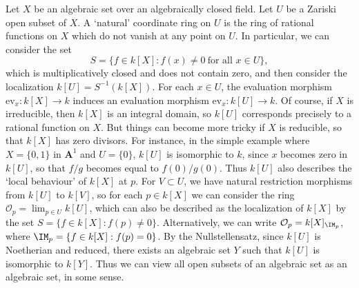 \begin{example}
    Let $X$ be an algebraic set over an algebraically closed field. Let $U$ be a Zariski open subset of $X$. A `natural' coordinate ring on $U$ is the ring of rational functions on $X$ which do not vanish at any point on $U$. In particular, we can consider the set
    \[ S = \{ f \in k[X]: f(x) \neq 0\ \text{for all $x \in U$} \}, \]
    which is multiplicatively closed and does not contain zero, and then consider the localization $k[U] = S^{-1}(k[X])$. For each $x \in U$, the evaluation morphism $\text{ev}_x: k[X] \to k$ induces an evaluation morphism $\text{ev}_x: k[U] \to k$. Of course, if $X$ is irreducible, then $k[X]$ is an integral domain, so $k[U]$ corresponds precisely to a rational function on $X$. But things can become more tricky if $X$ is reducible, so that $k[X]$ has zero divisors. For instance, in the simple example where $X = \{ 0, 1 \}$ in $\mathbf{A}^1$ and $U = \{ 0 \}$, $k[U]$ is isomorphic to $k$, since $x$ becomes zero in $k[U]$, so that $f/g$ becomes equal to $f(0) / g(0)$. Thus $k[U]$ also describes the `local behaviour' of $k[X]$ at $p$. For $V \subset U$, we have natural restriction morphisms from $k[U]$ to $k[V]$, so for each $p \in k[X]$ we can consider the ring $\mathcal{O}_p = \lim_{p \in U} k[U]$, which can also be described as the localization of $k[X]$ by the set $S = \{ f \in k[X]: f(p) \neq 0 \}$. Alternatively, we can write $\mathcal{O}_p = k[X]_{\IM_p}$, where $\IM_p = \{ f \in k[X]: f(p) = 0 \}$. By the Nullstellensatz, since $k[U]$ is Noetherian and reduced, there exists an algebraic set $Y$ such that $k[U]$ is isomorphic to $k[Y]$. Thus we can view all open subsets of an algebraic set as an algebraic set, in some sense.
\end{example}


